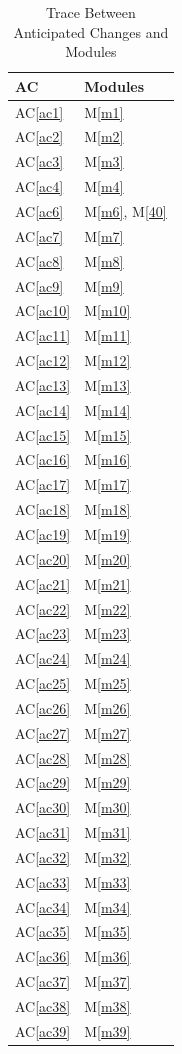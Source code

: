 \documentclass[12pt, titlepage]{article}
\newcommand{\acref}[1]{AC\ref{#1}}
\newcommand{\mref}[1]{M\ref{#1}}
\begin{document}
	\begin{longtable}{p{} p{}}
		\caption{Trace Between Anticipated Changes and Modules}
		\label{TblACT}\\
		\toprule
		\textbf{AC} & \textbf{Modules}\\
		\midrule
		\acref{ac1} & \mref{m1}\\
		\acref{ac2} & \mref{m2}\\
		\acref{ac3} & \mref{m3}\\
		\acref{ac4} & \mref{m4}\\
		\acref{ac6} & \mref{m6}, \mref{40}\\
		\acref{ac7} & \mref{m7}\\
		\acref{ac8} & \mref{m8}\\
		\acref{ac9} & \mref{m9}\\
		\acref{ac10} & \mref{m10}\\
		\acref{ac11} & \mref{m11}\\
		\acref{ac12} & \mref{m12}\\
		\acref{ac13} & \mref{m13}\\
		\acref{ac14} & \mref{m14}\\
		\acref{ac15} & \mref{m15}\\
		\acref{ac16} & \mref{m16}\\
		\acref{ac17} & \mref{m17}\\
		\acref{ac18} & \mref{m18}\\
		\acref{ac19} & \mref{m19}\\
		\acref{ac20} & \mref{m20}\\
		\acref{ac21} & \mref{m21}\\
		\acref{ac22} & \mref{m22}\\
		\acref{ac23} & \mref{m23}\\
		\acref{ac24} & \mref{m24}\\
		\acref{ac25} & \mref{m25}\\
		\acref{ac26} & \mref{m26}\\
		\acref{ac27} & \mref{m27}\\
		\acref{ac28} & \mref{m28}\\
		\acref{ac29} & \mref{m29}\\
		\acref{ac30} & \mref{m30}\\
		\acref{ac31} & \mref{m31}\\
		\acref{ac32} & \mref{m32}\\
		\acref{ac33} & \mref{m33}\\
		\acref{ac34} & \mref{m34}\\
		\acref{ac35} & \mref{m35}\\
		\acref{ac36} & \mref{m36}\\
		\acref{ac37} & \mref{m37}\\
		\acref{ac38} & \mref{m38}\\
		\acref{ac39} & \mref{m39}\\
		
		\bottomrule
	\end{longtable}
\end{document}
